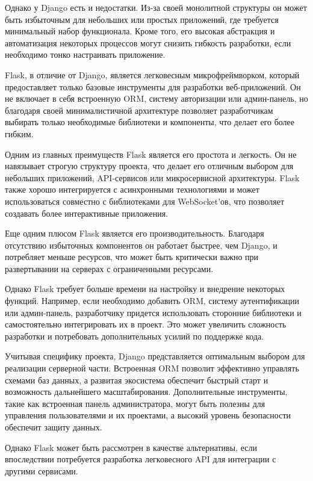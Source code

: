 Однако у Django есть и недостатки. Из-за своей монолитной структуры он может быть избыточным для небольших или простых приложений, где требуется минимальный набор функционала. Кроме того, его высокая абстракция и автоматизация некоторых процессов могут снизить гибкость разработки, если необходимо тонко настраивать приложение.

Flask, в отличие от Django, является легковесным микрофреймворком, который предоставляет только базовые инструменты для разработки веб-приложений. Он не включает в себя встроенную ORM, систему авторизации или админ-панель, но благодаря своей минималистичной архитектуре позволяет разработчикам выбирать только необходимые библиотеки и компоненты, что делает его более гибким.

Одним из главных преимуществ Flask является его простота и легкость. Он не навязывает строгую структуру проекта, что делает его отличным выбором для небольших приложений, API-сервисов или микросервисной архитектуры. Flask также хорошо интегрируется с асинхронными технологиями и может использоваться совместно с библиотеками для WebSocket’ов, что позволяет создавать более интерактивные приложения.

Еще одним плюсом Flask является его производительность. Благодаря отсутствию избыточных компонентов он работает быстрее, чем Django, и потребляет меньше ресурсов, что может быть критически важно при развертывании на серверах с ограниченными ресурсами.

Однако Flask требует больше времени на настройку и внедрение некоторых функций. Например, если необходимо добавить ORM, систему аутентификации или админ-панель, разработчику придется использовать сторонние библиотеки и самостоятельно интегрировать их в проект. Это может увеличить сложность разработки и потребовать дополнительных усилий по поддержке кода.

Учитывая специфику проекта, Django представляется оптимальным выбором для реализации серверной части. Встроенная ORM позволит эффективно управлять схемами баз данных, а развитая экосистема обеспечит быстрый старт и возможность дальнейшего масштабирования. Дополнительные инструменты, такие как встроенная панель администратора, могут быть полезны для управления пользователями и их проектами, а высокий уровень безопасности обеспечит защиту данных.

Однако Flask может быть рассмотрен в качестве альтернативы, если впоследствии потребуется разработка легковесного API для интеграции с другими сервисами.


